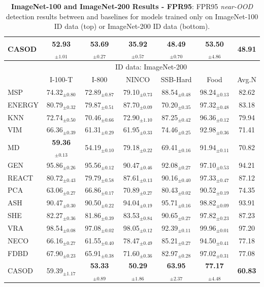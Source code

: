 \begin{table}[t!]
{\begin{tabular}{|l|ccccc|c|}
CASOD    & \textbf{52.93}$_{\pm  1.01}$  & \textbf{53.69}$_{\pm  0.27}$  & \textbf{35.92}$_{\pm  0.57}$  & \textbf{48.49}$_{\pm  0.70}$  & \textbf{53.50}$_{\pm  4.86}$  & \textbf{48.91}   \\ \hline
			\multirow{2}{*}{} &  \multicolumn{6}{c|}{ID data: ImageNet-200}  \\ \cline{2-7}
			& I-100-T & I-800  & NINCO & SSB-Hard & Food & Avg.N\\ \hline
            MSP    & 74.32$_{\pm 0.80}$ & 72.89$_{\pm 0.87}$ & 79.10$_{\pm 0.73}$ & 88.54$_{\pm 0.48}$ & 98.24$_{\pm 0.13}$ & 82.62  \\
ENERGY & 80.79$_{\pm 0.32}$ & 79.87$_{\pm 0.51}$ & 87.70$_{\pm 0.09}$ & 70.20$_{\pm 0.35}$ & 97.32$_{\pm 0.48}$ & 83.18  \\
KNN    & 72.74$_{\pm 0.50}$ & 70.46$_{\pm 0.66}$ & 72.90$_{\pm 1.10}$ & 87.25$_{\pm 0.42}$ & 96.36$_{\pm 0.12}$ & 79.94 \\
VIM    & 66.36$_{\pm 0.39}$ & 61.31$_{\pm 0.29}$ & 61.95$_{\pm 0.33}$ & 74.46$_{\pm 0.25}$ & 92.98$_{\pm 0.36}$ & 71.41\\
MD     & \textbf{59.36}$_{\pm 0.13}$ & 54.19$_{\pm 0.10}$ & 79.18$_{\pm 0.22}$ & 69.41$_{\pm 0.16}$ & 91.94$_{\pm 0.11}$ & 70.82\\
GEN    & 95.86$_{\pm 0.26}$ & 95.56$_{\pm 0.12}$ & 90.47$_{\pm 0.46}$ & 92.08$_{\pm 0.27}$ & 97.10$_{\pm 0.53}$ & 94.21 \\
REACT  & 80.72$_{\pm 0.43}$ & 79.79$_{\pm 0.58}$ & 87.61$_{\pm 0.13}$ & 90.16$_{\pm 0.40}$ & 97.33$_{\pm 0.47}$ & 87.12 \\
PCA    & 63.06$_{\pm 0.27}$ & 66.86$_{\pm 0.17}$ & 70.89$_{\pm 0.27}$ & 80.43$_{\pm 0.02}$ & 90.52$_{\pm 0.19}$ & 74.35  \\
ASH    & 90.47$_{\pm 0.30}$ & 90.50$_{\pm 0.22}$ & 94.04$_{\pm 0.19}$ & 95.71$_{\pm 0.16}$ & 98.82$_{\pm 0.09}$ & 93.91 \\
SHE    & 82.27$_{\pm 0.36}$ & 81.86$_{\pm 0.39}$ & 83.53$_{\pm 0.84}$ & 90.65$_{\pm 0.27}$ & 97.82$_{\pm 0.23}$ & 87.23 \\
VRA    & 98.54$_{\pm 0.08}$ & 97.08$_{\pm 0.02}$ & 98.05$_{\pm 0.12}$ & 92.39$_{\pm 0.11}$ & 99.96$_{\pm 0.01}$ & 97.20 \\
NECO   & 66.16$_{\pm 0.27}$ & 61.55$_{\pm 0.40}$ & 78.47$_{\pm 0.49}$ & 85.21$_{\pm 0.27}$ & 94.50$_{\pm 0.41}$ & 77.18  \\
FDBD   & 67.90$_{\pm 0.23}$ & 65.91$_{\pm 0.38}$ & 71.60$_{\pm 0.36}$ & 82.97$_{\pm 0.28}$ & 97.02$_{\pm 0.31}$ & 77.08 \\ \hline
CASOD  & 59.39$_{\pm 1.17}$ & \textbf{53.33}$_{\pm 0.89}$ & \textbf{50.29}$_{\pm 1.86}$ & \textbf{63.95}$_{\pm 2.37}$ & \textbf{77.17}$_{\pm 4.48}$ & \textbf{60.83}\\ \hline
		\end{tabular}
	}
	\caption{\textbf{ImageNet-100 and ImageNet-200 Results - FPR95}: FPR95 \textit{near-OOD} detection results between \sys and baselines for models trained only on ImageNet-100 ID data (top) or ImageNet-200 ID data (bottom).
	}
	\label{tab:table_ood_fpr95}
\end{table}

